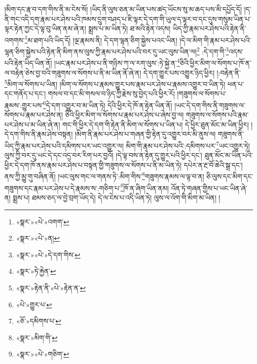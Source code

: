 །མིག་དང་རྣ་བ་དག་གིས་ནི་མ་ངེས་སོ། །ཡིད་ནི་ལུས་ཅན་མ་ཡིན་པས་ཚད་ཡོངས་སུ་མ་ཆད་པས་མི་དཔྱོད་དོ། །ད་ནི་གང་འདི་དག་རྣམ་པར་ཤེས་པའི་ཁམས་དྲུག་བཤད་པ་ཇི་ལྟར་དེ་དག་གི་ཡུལ་ད་ལྟར་བ་དང་དུས་གསུམ་ཡིན་པ་ལྟར་རྟེན་ཀྱང་དེ་ལྟ་བུ་ཡིན་ནམ་ཞེ་ན། སྨྲས་པ་མ་ཡིན་ཏེ། ཐ་མའི་རྟེན་འདས། ཡིད་ཀྱི་རྣམ་པར་ཤེས་པའི་རྟེན་ནི་འགགས་\footnote{«སྣར་»«པེ་»འགག་}མ་ཐག་པའི་ཡིད་དོ། །ལྔ་རྣམས་ནི། དེ་དག་ལྷན་ཅིག་སྐྱེས་པའང་ཡིན། །དེ་ལ་མིག་གི་རྣམ་པར་ཤེས་པའི་ལྷན་ཅིག་སྐྱེས་པའི་རྟེན་ནི་མིག་ནས་ལུས་ཀྱི་རྣམ་པར་ཤེས་པའི་བར་དུ་ཡང་ལུས་ཡིན་ལ།\footnote{«སྣར་»«པེ་»ན།} :དེ་དག་གི་\footnote{«སྣར་»«པེ་»དེ་དག་གིས་}འདས་པའི་རྟེན་ཡིད་ཡིན་ནོ། །ཡང་རྣམ་པར་ཤེས་པ་ནི་གཉིས་ཀ་ལ་རག་ལུས་:ཏེ་སྐྱེ་ན་\footnote{«སྣར་»ཏེ་རྐྱེན་}ཅིའི་ཕྱིར་མིག་ལ་སོགས་པ་ཁོ་ན་ལ་བརྟེན་ཅེས་བྱ་བའི་གཟུགས་ལ་སོགས་པ་ནི་མ་ཡིན་ནོ་ཞེ་ན། དེ་དག་གྱུར་པས་འགྱུར་ཉིད་ཕྱིར། །:བརྟེན་ནི་\footnote{«སྣར་»རྟེན་ནི་«པེ་»རྟེན་ན་}མིག་ལ་སོགས་པ་ཡིན། །མིག་ལ་སོགས་པ་རྣམས་གྱུར་པས་རྣམ་པར་ཤེས་པ་རྣམས་འགྱུར་བ་ཡིན་ཏེ། ཕན་པ་དང་གནོད་པ་དང་། གསལ་བ་དང་མི་གསལ་བ་ཉིད་ཀྱི་རྗེས་སུ་བྱེད་པའི་ཕྱིར་རོ། །གཟུགས་ལ་སོགས་པ་རྣམས་:གྱུར་པས་\footnote{«པེ་»གྱུར་པ་}དེ་དག་འགྱུར་བ་མ་ཡིན་ཏེ། དེའི་ཕྱིར་དེ་ཁོ་ན་རྟེན་ཡིན་ནོ། །ཡང་དེ་དག་གིས་ནི་གཟུགས་ལ་སོགས་པ་རྣམ་པར་ཤེས་ན། ཅིའི་ཕྱིར་མིག་ལ་སོགས་པ་རྣམ་པར་ཤེས་པ་ཞེས་བྱ་ལ། གཟུགས་ལ་སོགས་པའི་རྣམ་པར་ཤེས་པ་མ་ཡིན་ཞེ་ན། གང་གི་ཕྱིར་དེ་དག་གི་རྟེན་ནི་མིག་ལ་སོགས་པ་ཡིན་པ། དེ་ཕྱིར་ཐུན་མོང་མ་ཡིན་ཕྱིར། །དེ་དག་གིས་ནི་རྣམ་ཤེས་བསྟན། །མིག་ནི་རྣམ་པར་ཤེས་པ་གཞན་གྱི་རྟེན་དུ་འགྱུར་བར་མི་ནུས་ལ། གཟུགས་ནི་ཡིད་ཀྱི་རྣམ་པར་ཤེས་པའི་དམིགས་པར་ཡང་འགྱུར་ལ། མིག་གི་རྣམ་པར་ཤེས་པའི་:དམིགས་པར་\footnote{«ཅོ་»དམིགས་པ་}ཡང་འགྱུར་ཏེ། ལུས་ཀྱི་བར་དུ་ཡང་དེ་དང་འདྲ་བར་རིག་པར་བྱའོ། །དེ་ལྟ་བས་ན་རྟེན་དུ་གྱུར་པའི་ཕྱིར་དང་། ཐུན་མོང་མ་ཡིན་པའི་ཕྱིར་དེ་དག་ཁོ་ནས་རྣམ་པར་ཤེས་པ་བསྟན་གྱི་གཟུགས་ལ་སོགས་པ་ནི་མ་ཡིན་ཏེ། དཔེར་ན་རྔ་བོ་ཆེའི་སྒྲ་དང་། ནས་ཀྱི་མྱུ་གུ་བཞིན་ནོ། །ཡང་ལུས་གང་ལ་གནས་ཏེ་:མིག་གིས་\footnote{«སྣར་»མིག་གི་}གཟུགས་རྣམས་ལ་ལྟ་བ་ན། ཅི་ལུས་དང་མིག་དང་གཟུགས་དང་རྣམ་པར་ཤེས་པ་དེ་རྣམས་ས་:གཅིག་པ་\footnote{«སྣར་»«པེ་»གཅིག་}ཁོ་ན་ཞིག་ཡིན་ནམ། འོན་ཏེ་གཞན་གྱིས་པ་ཡང་ཡིན་ཞེ་ན། སྨྲས་པ། ཐམས་ཅད་ལ་བྱེ་བྲག་ཡོད་དེ། དེ་ལ་ངེས་པ་འདི་ཡིན་ཏེ། ལུས་ལ་འོག་གི་མིག་མ་ཡིན། །
